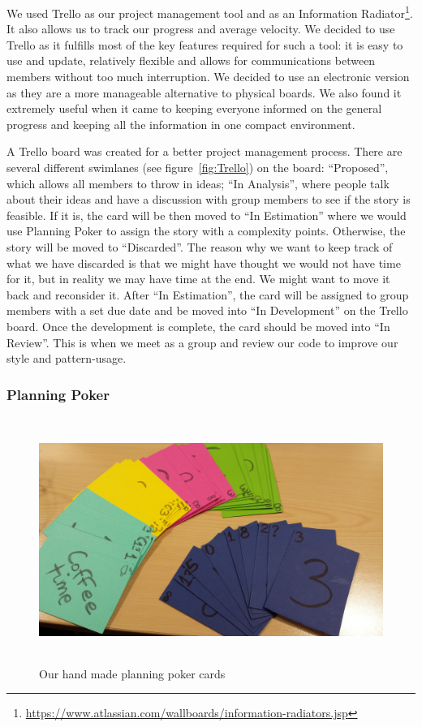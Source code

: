 \documentclass[11pt, a4paper]{article}
\begin{document}
We used Trello as our project management tool and as an Information Radiator\footnote{\url{https://www.atlassian.com/wallboards/information-radiators.jsp}}.
It also allows us to track our progress and average velocity. 
We decided to use Trello as it fulfills most of the key features required for such a tool: it is easy to use and update, relatively flexible and allows for communications between members without too much interruption. 
We decided to use an electronic version as they are a more manageable alternative to physical boards. 
We also found it extremely useful when it came to keeping everyone informed on the general progress and keeping all the information in one compact environment.

A Trello board was created for a better project management process. 
There are several different swimlanes (see figure~\ref{fig:Trello}) on the board: ``Proposed'', which allows all members to throw in ideas; ``In Analysis'', where people talk about their ideas and have a discussion with group members to see if the story is feasible. 
If it is, the card will be then moved to ``In Estimation'' where we would use Planning Poker to assign the story with a complexity points.
Otherwise, the story will be moved to ``Discarded''.
The reason why we want to keep track of what we have discarded is that we might have thought we would not have time for it, but in reality we may have time at the end.
We might want to move it back and reconsider it. 
After ``In Estimation'', the card will be assigned to group members with a set due date and be moved into ``In Development'' on the Trello board. 
Once the development is complete, the card should be moved into ``In Review''. 
This is when we meet as a group and review our code to improve our style and pattern-usage.

\subsubsection{Planning Poker}
\begin{figure}[h!]
\centering
\includegraphics[height=80mm,width=130mm]{planningPokers.jpg}
\caption{Our hand made planning poker cards}
\end{figure}
\end{document}
